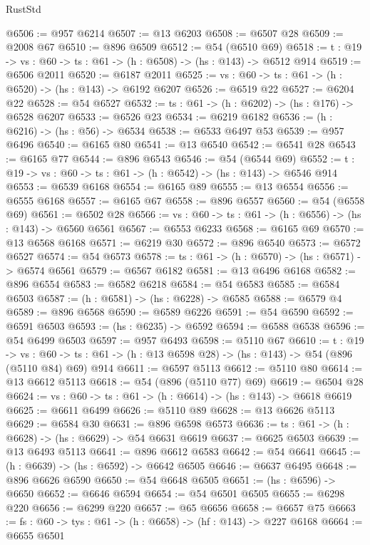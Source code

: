 \begin{lexlean}{RustStd}
\begin{coremodule}
@6506 := @957 @6214
@6507 := @13 @6203
@6508 := @6507 @28
@6509 := @2008 @67
@6510 := @896 @6509
@6512 := @54 (@6510 @69)
@6518 := {t : @19} -> {vs : @60} -> {ts : @61} -> (h : @6508) -> (hs : @143) -> @6512 @914
@6519 := @6506 @2011
@6520 := @6187 @2011
@6525 := {vs : @60} -> {ts : @61} -> (h : @6520) -> (hs : @143) -> @6192 @6207
@6526 := @6519 @22
@6527 := @6204 @22
@6528 := @54 @6527
@6532 := {ts : @61} -> (h : @6202) -> (hs : @176) -> @6528 @6207
@6533 := @6526 @23
@6534 := @6219 @6182
@6536 := (h : @6216) -> (hs : @56) -> @6534
@6538 := @6533 @6497 @53
@6539 := @957 @6496
@6540 := @6165 @80
@6541 := @13 @6540
@6542 := @6541 @28
@6543 := @6165 @77
@6544 := @896 @6543
@6546 := @54 (@6544 @69)
@6552 := {t : @19} -> {vs : @60} -> {ts : @61} -> (h : @6542) -> (hs : @143) -> @6546 @914
@6553 := @6539 @6168
@6554 := @6165 @89
@6555 := @13 @6554
@6556 := @6555 @6168
@6557 := @6165 @67
@6558 := @896 @6557
@6560 := @54 (@6558 @69)
@6561 := @6502 @28
@6566 := {vs : @60} -> {ts : @61} -> (h : @6556) -> (hs : @143) -> @6560 @6561
@6567 := @6553 @6233
@6568 := @6165 @69
@6570 := @13 @6568 @6168
@6571 := @6219 @30
@6572 := @896 @6540
@6573 := @6572 @6527
@6574 := @54 @6573
@6578 := {ts : @61} -> (h : @6570) -> (hs : @6571) -> @6574 @6561
@6579 := @6567 @6182
@6581 := @13 @6496 @6168
@6582 := @896 @6554
@6583 := @6582 @6218
@6584 := @54 @6583
@6585 := @6584 @6503
@6587 := (h : @6581) -> (hs : @6228) -> @6585
@6588 := @6579 @4
@6589 := @896 @6568
@6590 := @6589 @6226
@6591 := @54 @6590
@6592 := @6591 @6503
@6593 := (hs : @6235) -> @6592
@6594 := @6588 @6538
@6596 := @54 @6499 @6503
@6597 := @957 @6493
@6598 := @5110 @67
@6610 := {t : @19} ->
  {vs : @60} -> {ts : @61} -> (h : @13 @6598 @28) -> (hs : @143) -> @54 (@896 (@5110 @84) @69) @914
@6611 := @6597 @5113
@6612 := @5110 @80
@6614 := @13 @6612 @5113
@6618 := @54 (@896 (@5110 @77) @69)
@6619 := @6504 @28
@6624 := {vs : @60} -> {ts : @61} -> (h : @6614) -> (hs : @143) -> @6618 @6619
@6625 := @6611 @6499
@6626 := @5110 @89
@6628 := @13 @6626 @5113
@6629 := @6584 @30
@6631 := @896 @6598 @6573
@6636 := {ts : @61} -> (h : @6628) -> (hs : @6629) -> @54 @6631 @6619
@6637 := @6625 @6503
@6639 := @13 @6493 @5113
@6641 := @896 @6612 @6583
@6642 := @54 @6641
@6645 := (h : @6639) -> (hs : @6592) -> @6642 @6505
@6646 := @6637 @6495
@6648 := @896 @6626 @6590
@6650 := @54 @6648 @6505
@6651 := (hs : @6596) -> @6650
@6652 := @6646 @6594
@6654 := @54 @6501 @6505
@6655 := @6298 @220
@6656 := @6299 @220
@6657 := @65 @6656
@6658 := @6657 @75
@6663 := {fs : @60} -> {tys : @61} -> (h : @6658) -> (hf : @143) -> @227 @6168
@6664 := @6655 @6501

\end{coremodule}
\end{lexlean}
